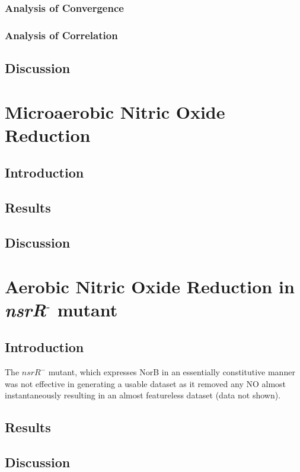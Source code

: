 \subsubsection{Analysis of Convergence}
\subsubsection{Analysis of Correlation}
\subsection{Discussion}
\section{Microaerobic Nitric Oxide Reduction}
\subsection{Introduction}
\subsection{Results}
\subsection{Discussion}
\section{\texorpdfstring{Aerobic Nitric Oxide Reduction in \textit{nsrR$^\textrm{-}$} mutant}{Aerobic Nitric Oxide Reduction in nsrR- mutant}}
\subsection{Introduction}
 The $\mathit{nsrR}^-$ mutant, which expresses NorB in an essentially constitutive manner was not effective in generating a usable dataset as it removed any NO almost instantaneously resulting in an almost featureless dataset (data not shown).
\subsection{Results}
\subsection{Discussion}
